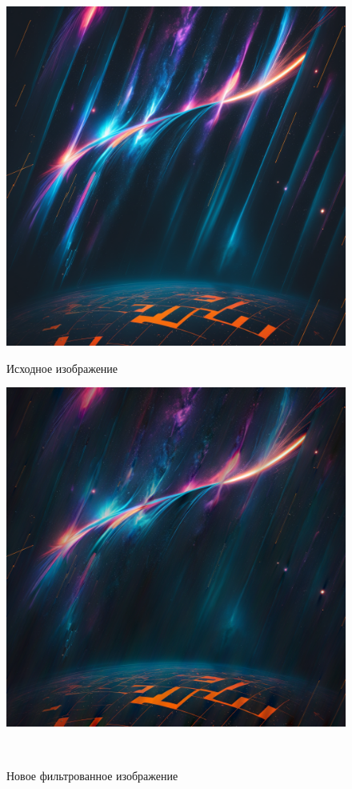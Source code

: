 \documentclass[a4paper]{article}
\begin{document}
\begin{figure}[H]
    \begin{minipage}{0.49\textwidth}
        \centering \includegraphics[width=\textwidth]{3.png}
        \caption{Исходное изображение}
    \end{minipage}\hfill
    \begin{minipage}{0.49\textwidth}
        \centering \includegraphics[width=\textwidth]{1/im3_recovered.png}
        \caption{Новое фильтрованное изображение}
    \end{minipage}\\[1em]
\end{figure}\noindent\
\end{document}
